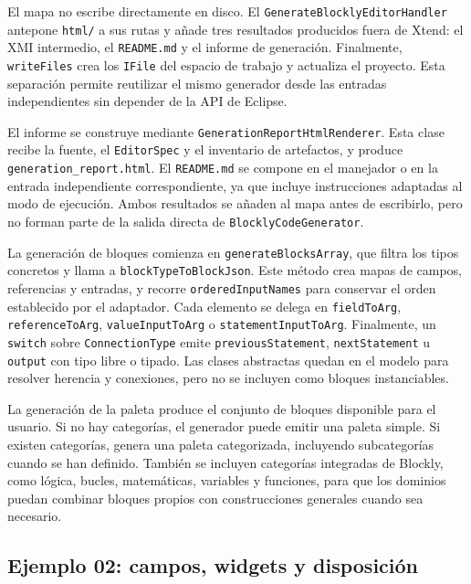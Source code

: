El mapa no escribe directamente en disco. El
\texttt{GenerateBlocklyEditorHandler} antepone \texttt{html/} a sus rutas y
añade tres resultados producidos fuera de Xtend: el XMI intermedio, el
\texttt{README.md} y el informe de generación. Finalmente,
\texttt{writeFiles} crea los \texttt{IFile} del espacio de trabajo y actualiza el proyecto.
Esta separación permite reutilizar el mismo generador desde las entradas
independientes sin depender de la API de Eclipse.

El informe se construye mediante
\texttt{GenerationReport}\allowbreak\texttt{HtmlRenderer}. Esta clase recibe la
fuente, el \texttt{EditorSpec} y el inventario de artefactos, y produce
\texttt{generation\_}\allowbreak\texttt{report.html}. El \texttt{README.md} se
compone en el manejador o en la entrada independiente correspondiente, ya que
incluye instrucciones adaptadas al modo de ejecución. Ambos resultados se
añaden al mapa antes de escribirlo, pero no forman parte de la salida directa de
\texttt{BlocklyCodeGenerator}.

La generación de bloques comienza en \texttt{generateBlocksArray}, que filtra
los tipos concretos y llama a \texttt{blockTypeToBlockJson}. Este método crea
mapas de campos, referencias y entradas, y recorre
\texttt{orderedInputNames} para conservar el orden establecido por el
adaptador. Cada elemento se delega en \texttt{fieldToArg},
\texttt{referenceToArg}, \texttt{valueInputToArg} o
\texttt{statementInput}\allowbreak\texttt{ToArg}. Finalmente, un
\texttt{switch} sobre \texttt{Connection}\allowbreak\texttt{Type} emite
\texttt{previous}\allowbreak\texttt{Statement},
\texttt{nextStatement} u \texttt{output} con tipo libre o tipado. Las clases
abstractas quedan en el modelo para resolver herencia y conexiones, pero no se
incluyen como bloques instanciables.

La generación de la paleta produce el conjunto de bloques disponible para el
usuario. Si no hay categorías, el generador puede emitir una paleta simple. Si
existen categorías, genera una paleta categorizada, incluyendo subcategorías cuando se
han definido. También se incluyen categorías integradas de Blockly, como lógica,
bucles, matemáticas, variables y funciones, para que los dominios puedan
combinar bloques propios con construcciones generales cuando sea necesario.

\subsection{Ejemplo 02: campos, widgets y disposición}

